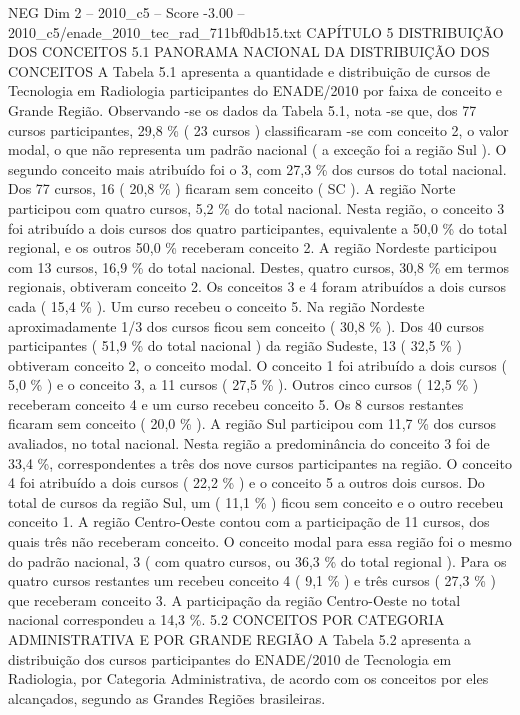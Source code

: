 \begin{textsample}{NEG Dim 2 – 2010\_c5 – Score -3.00 – 2010\_c5/enade\_2010\_tec\_rad\_711bf0db15.txt}  \label{ex:f2_neg_101}
CAPÍTULO 5 DISTRIBUIÇÃO DOS CONCEITOS 5.1 PANORAMA NACIONAL DA DISTRIBUIÇÃO DOS CONCEITOS A Tabela 5.1 apresenta a quantidade e distribuição de cursos de Tecnologia em Radiologia participantes do ENADE/2010 por faixa de conceito e Grande Região.
Observando -se os dados da Tabela 5.1, nota -se que, dos 77 cursos participantes, 29,8 \% ( 23 cursos ) classificaram -se com conceito 2, o valor modal, o que não representa um padrão nacional ( a exceção foi a região Sul ).
O segundo conceito mais atribuído foi o 3, com 27,3 \% dos cursos do total nacional.
Dos 77 cursos, 16 ( 20,8 \% ) ficaram sem conceito ( SC ).
A região Norte participou com quatro cursos, 5,2 \% do total nacional.
Nesta região, o conceito 3 foi atribuído a dois cursos dos quatro participantes, equivalente a 50,0 \% do total regional, e os outros 50,0 \% receberam conceito 2.
A região Nordeste participou com 13 cursos, 16,9 \% do total nacional.
Destes, quatro cursos, 30,8 \% em termos regionais, obtiveram conceito 2.
Os conceitos 3 e 4 foram atribuídos a dois cursos cada ( 15,4 \% ).
Um curso recebeu o conceito 5.
Na região Nordeste aproximadamente 1/3 dos cursos ficou sem conceito ( 30,8 \% ).
Dos 40 cursos participantes ( 51,9 \% do total nacional ) da região Sudeste, 13 ( 32,5 \% ) obtiveram conceito 2, o conceito modal.
O conceito 1 foi atribuído a dois cursos ( 5,0 \% ) e o conceito 3, a 11 cursos ( 27,5 \% ).
Outros cinco cursos ( 12,5 \% ) receberam conceito 4 e um curso recebeu conceito 5.
Os 8 cursos restantes ficaram sem conceito ( 20,0 \% ).
A região Sul participou com 11,7 \% dos cursos avaliados, no total nacional.
Nesta região a predominância do conceito 3 foi de 33,4 \%, correspondentes a três dos nove cursos participantes na região.
O conceito 4 foi atribuído a dois cursos ( 22,2 \% ) e o conceito 5 a outros dois cursos.
Do total de cursos da região Sul, um ( 11,1 \% ) ficou sem conceito e o outro recebeu conceito 1.
A região Centro-Oeste contou com a participação de 11 cursos, dos quais três não receberam conceito.
O conceito modal para essa região foi o mesmo do padrão nacional, 3 ( com quatro cursos, ou 36,3 \% do total regional ).
Para os quatro cursos restantes um recebeu conceito 4 ( 9,1 \% ) e três cursos ( 27,3 \% ) que receberam conceito 3.
A participação da região Centro-Oeste no total nacional correspondeu a 14,3 \%. 5.2 CONCEITOS POR CATEGORIA ADMINISTRATIVA E POR GRANDE REGIÃO A Tabela 5.2 apresenta a distribuição dos cursos participantes do ENADE/2010 de Tecnologia em Radiologia, por Categoria Administrativa, de acordo com os conceitos por eles alcançados, segundo as Grandes Regiões brasileiras.

\end{textsample}

